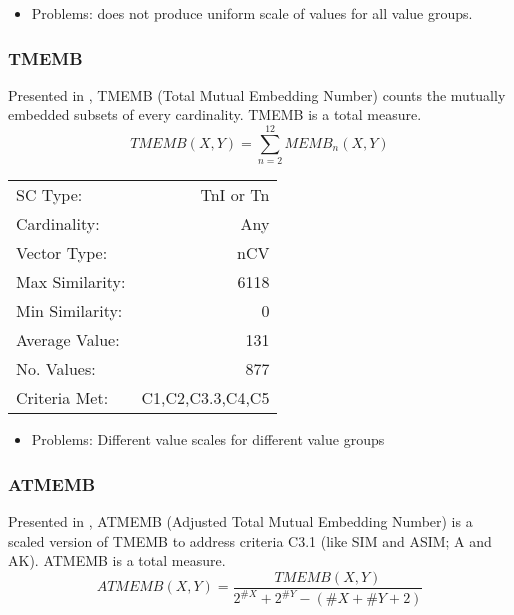 \documentclass{article}
\begin{document}
\begin{itemize}
\item Problems: does not produce uniform scale of values for all value
  groups.
\end{itemize}
\subsubsection{TMEMB}
\label{sec-11-5-3}

Presented in \citet[pp. 492]{Rahn1979}, TMEMB (Total Mutual Embedding
Number) counts the mutually embedded subsets of every
cardinality. TMEMB is a total measure.
$$TMEMB\left(X,Y\right)=\sum_{n=2}^{12}MEMB_{n}\left(X,Y\right)$$

\begin{center}
\begin{tabular}{lr}
 SC Type:         &         TnI or Tn  \\
 Cardinality:     &               Any  \\
 Vector Type:     &               nCV  \\
 Max Similarity:  &              6118  \\
 Min Similarity:  &                 0  \\
 Average Value:   &               131  \\
 No. Values:      &               877  \\
 Criteria Met:    &  C1,C2,C3.3,C4,C5  \\
\end{tabular}
\end{center}


\begin{itemize}
\item Problems: Different value scales for different value groups
\end{itemize}
\subsubsection{ATMEMB}
\label{sec-11-5-4}

Presented in \citet[pp. 494]{Rahn1979}, ATMEMB (Adjusted Total Mutual
Embedding Number) is a scaled version of TMEMB to address criteria
C3.1 (like SIM and ASIM; A and AK). ATMEMB is a total measure.
$$ATMEMB\left(X,Y\right)=\frac{TMEMB\left(X,Y\right)}{2^{\#X}+2^{\#Y}-\left(\#X+\#Y+2\right)}$$
\end{document}
